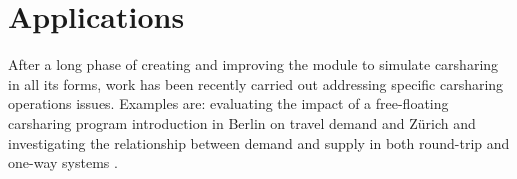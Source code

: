 \section{Applications}
After a long phase of creating and improving the module to simulate carsharing in all its forms, work has been recently carried out addressing specific carsharing operations issues. Examples are: evaluating the impact of a free-floating carsharing program introduction in Berlin on travel demand \citep[][]{CiariEtAl_TRR_2014} and Zürich \citep[][]{CiariEtAl_Transportation_2014} and investigating the relationship between demand and supply in both round-trip and one-way systems \citep[][]{BalacEtAl_TRB_2015}.




